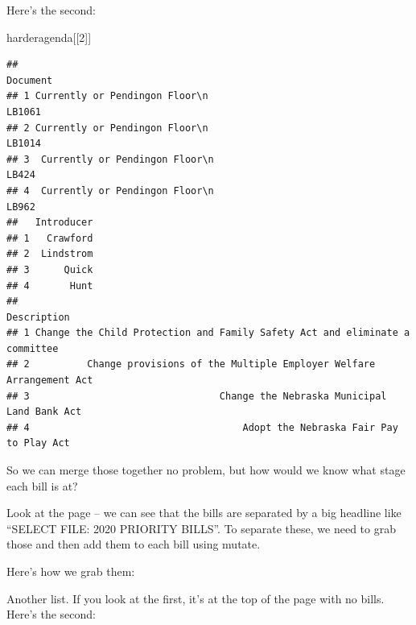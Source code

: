 \documentclass[]{book}
\newenvironment{Shaded}{\begin{snugshade}}{\end{snugshade}}
\newcommand{\DecValTok}[1]{\textcolor[rgb]{0.00,0.00,0.81}{#1}}
\newcommand{\KeywordTok}[1]{\textcolor[rgb]{0.13,0.29,0.53}{\textbf{#1}}}
\newcommand{\NormalTok}[1]{#1}
\newcommand{\OperatorTok}[1]{\textcolor[rgb]{0.81,0.36,0.00}{\textbf{#1}}}
\newcommand{\StringTok}[1]{\textcolor[rgb]{0.31,0.60,0.02}{#1}}
\begin{document}
Here's the second:

\begin{Shaded}
\begin{Highlighting}[]
\NormalTok{harderagenda[[}\DecValTok{2}\NormalTok{]]}
\end{Highlighting}
\end{Shaded}

\begin{verbatim}
##                                                                                               Document
## 1 Currently or Pendingon Floor\n                                                                LB1061
## 2 Currently or Pendingon Floor\n                                                                LB1014
## 3  Currently or Pendingon Floor\n                                                                LB424
## 4  Currently or Pendingon Floor\n                                                                LB962
##   Introducer
## 1   Crawford
## 2  Lindstrom
## 3      Quick
## 4       Hunt
##                                                                   Description
## 1 Change the Child Protection and Family Safety Act and eliminate a committee
## 2          Change provisions of the Multiple Employer Welfare Arrangement Act
## 3                                 Change the Nebraska Municipal Land Bank Act
## 4                                     Adopt the Nebraska Fair Pay to Play Act
\end{verbatim}

So we can merge those together no problem, but how would we know what stage each bill is at?

Look at the page -- we can see that the bills are separated by a big headline like ``SELECT FILE: 2020 PRIORITY BILLS''. To separate these, we need to grab those and then add them to each bill using mutate.

Here's how we grab them:

\begin{Shaded}
\end{Shaded}

Another list. If you look at the first, it's at the top of the page with no bills. Here's the second:
\end{document}

